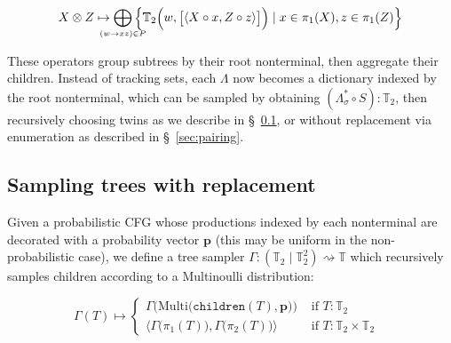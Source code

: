 \documentclass[sigplan,nonacm]{acmart}\settopmatter{printfolios=false,printccs=false,printacmref=false}
\begin{document}
\begin{equation*}
  \begin{footnotesize}
  X \otimes Z \mapsto \bigoplus_{\mathclap{(w\rightarrow xz) \in P}}\Big\{\mathbb{T}_2\Big(w, \big[\langle X\circ x, Z\circ z\rangle\big]\Big) \mid x \in \pi_1(X), z \in \pi_1(Z)\Big\}
\end{footnotesize}
\end{equation*}

  These operators group subtrees by their root nonterminal, then aggregate their children. Instead of tracking sets, each $\Lambda$ now becomes a dictionary indexed by the root nonterminal, which can be sampled by obtaining $(\Lambda_\sigma^* \circ S): \mathbb{T}_2$, then recursively choosing twins as we describe in \S~\ref{sec:replacement}, or without replacement via enumeration as described in \S~\ref{sec:pairing}.


\subsection{Sampling trees with replacement}\label{sec:replacement}

Given a probabilistic CFG whose productions indexed by each nonterminal are decorated with a probability vector $\mathbf{p}$ (this may be uniform in the non-probabilistic case), we define a tree sampler $\Gamma: (\mathbb{T}_2 \mid \mathbb{T}_2^2) \rightsquigarrow \mathbb{T}$ which recursively samples children according to a Multinoulli distribution:

\begin{equation*}
  \Gamma(T) \mapsto \begin{cases}
        \Gamma\big(\text{Multi} \big(\texttt{children}(T), \mathbf{p}\big)\big) & \text{ if $T: \mathbb{T}_2$ } \\
        \big\langle \Gamma\big(\pi_1(T)\big), \Gamma\big(\pi_2(T)\big) \big\rangle & \text{ if $T: \mathbb{T}_2\times\mathbb{T}_2$ }
  \end{cases}
\end{equation*}
\end{document}
